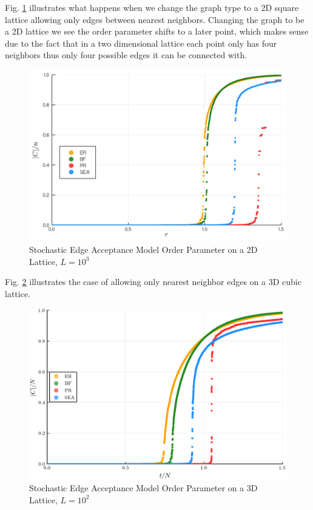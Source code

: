 Fig. \ref{fig:Lattice2D_ER_BF_PR_SEA_transition} illustrates what happens when we change the graph type to a 2D square lattice allowing only edges between nearest neighbors.
Changing the graph to be a 2D lattice we see the order parameter shifts to a later point, which makes sense due to the fact that in a two dimensional lattice each point only has four neighbors thus only four possible edges it can be connected with.

\begin{figure}[H]
	\centering
	\includegraphics[width=350pt, clip]{images/Lattice2D_ER_BF_PR_SEA_1e6_order_param.png}
	\caption{Stochastic Edge Acceptance Model Order Parameter on a 2D Lattice, $L = 10^3$}
	\label{fig:Lattice2D_ER_BF_PR_SEA_transition}
\end{figure}

Fig. \ref{fig:Lattice3D_ER_BF_PR_SEA_transition} illustrates the case of allowing only nearest neighbor edges on a 3D cubic lattice.

\begin{figure}[H]
	\centering
	\includegraphics[width=350pt, clip]{images/Lattice3D_ER_BF_PR_SEA_1e6_order_param.png}
	\caption{Stochastic Edge Acceptance Model Order Parameter on a 3D Lattice, $L = 10^2$}
	\label{fig:Lattice3D_ER_BF_PR_SEA_transition}
\end{figure}
